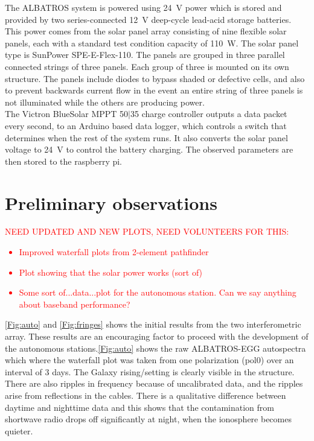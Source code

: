 \documentclass{ws-jai}
\newcommand{\attention}[1]{\textcolor{red}{\bf {#1}}}
\begin{document}
The ALBATROS system is powered using \SI{24}{\volt} power which is stored and provided by two series-connected \SI{12}{\volt} deep-cycle lead-acid storage batteries. This power comes from the solar panel array consisting of nine flexible solar panels, each with a standard test condition capacity of \SI{110}{\watt}. The solar panel type is SunPower SPE-E-Flex-110. The panels are grouped in three parallel connected strings of three panels. Each group of three is mounted on its own structure. The panels include diodes to bypass shaded or defective cells, and also to prevent backwards current flow in the event an entire string of three panels is not illuminated while the others are producing power. \\

The Victron BlueSolar MPPT 50$\vert$35 charge controller outputs a data packet every second, to an Arduino based data logger, which controls a switch that determines when the rest of the system runs. It also converts the solar panel voltage to \SI{24}{\volt} to control the battery charging. The observed parameters are then stored to the raspberry pi.

\section{Preliminary observations}

\attention{NEED UPDATED AND NEW PLOTS, NEED VOLUNTEERS FOR THIS:
  \begin{itemize}
    \item{Improved waterfall plots from 2-element pathfinder}
    \item{Plot showing that the solar power works (sort of)}
    \item{Some sort of...data...plot for the autonomous station.  Can
      we say anything about baseband performance?}
  \end{itemize}
}
 
\autoref{Fig:auto} and \autoref{Fig:fringes} shows the initial results from the two interferometric array. These results are an encouraging factor to proceed with the development of the autonomous stations.\autoref{Fig:auto} shows the raw ALBATROS-EGG autospectra which where the waterfall plot was taken from one polarization (pol0) over an interval of 3 days. The Galaxy rising/setting is clearly visible in the structure. There are also ripples in frequency because of uncalibrated data, and the ripples arise from reflections in the cables. There is a qualitative difference between daytime and nighttime data and this shows that the contamination from shortwave radio drops off significantly at night, when the ionosphere becomes quieter.
\end{document}
